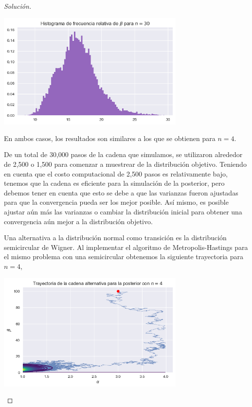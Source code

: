 \documentclass{article}
\begin{document}
\begin{enumerate}
\begin{proof}[Solución]
        \begin{center}
            \includegraphics[width=0.7\textwidth]{tarea7/histbeta30.png}
        \end{center}

        En ambos casos, los resultados son similares a los que se obtienen para $n=4$.

        De un total de 30,000 pasos de la cadena que simulamos, se utilizaron alrededor de
        2,500 o 1,500 para comenzar a muestrear de la distribución objetivo. Teniendo en cuenta
        que el costo computacional de 2,500 pasos es relativamente bajo, tenemos que la cadena 
        es eficiente para la simulación de la posterior, pero debemos tener en cuenta que esto 
        se debe a que las varianzas fueron ajustadas para que la convergencia pueda ser los mejor
        posible. Así mismo, es posible ajustar aún más las varianzas o cambiar la distribución
        inicial para obtener una convergencia aún mejor a la distribución objetivo.

        Una alternativa a la distribución normal como transición es la distribución semicircular
        de Wigner. Al implementar el algoritmo de Metropolis-Hastings para el mismo problema con
        una semicircular obtenemos la siguiente trayectoria para $n=4$,

        \begin{center}
            \includegraphics[width=0.7\textwidth]{tarea7/trajsemi4.png}
        \end{center}


\end{proof}
\end{enumerate}
\end{document}
